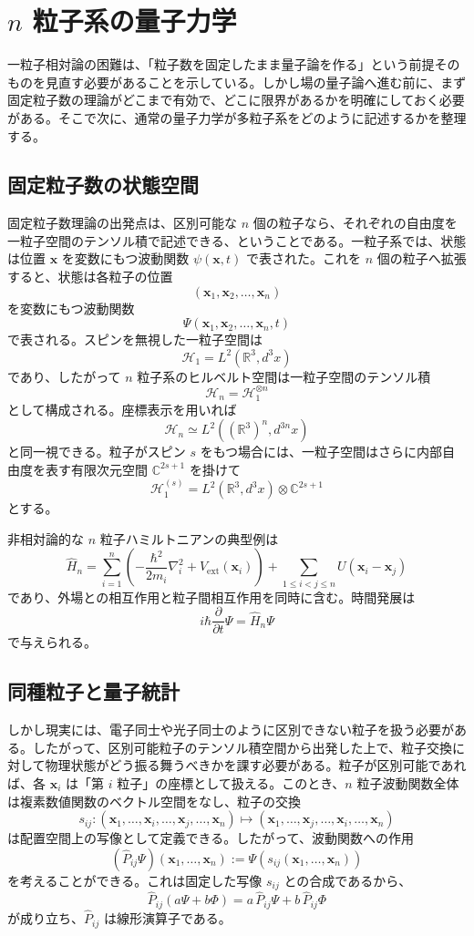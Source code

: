 \section{$n$ 粒子系の量子力学}

一粒子相対論の困難は、「粒子数を固定したまま量子論を作る」という前提そのものを見直す必要があることを示している。しかし場の量子論へ進む前に、まず固定粒子数の理論がどこまで有効で、どこに限界があるかを明確にしておく必要がある。そこで次に、通常の量子力学が多粒子系をどのように記述するかを整理する。

\subsection{固定粒子数の状態空間}
固定粒子数理論の出発点は、区別可能な $n$ 個の粒子なら、それぞれの自由度を一粒子空間のテンソル積で記述できる、ということである。一粒子系では、状態は位置 $\mathbf{x}$ を変数にもつ波動関数 $\psi(\mathbf{x},t)$ で表された。これを $n$ 個の粒子へ拡張すると、状態は各粒子の位置
\[
(\mathbf{x}_1,\mathbf{x}_2,\dots,\mathbf{x}_n)
\]
を変数にもつ波動関数
\[
\Psi(\mathbf{x}_1,\mathbf{x}_2,\dots,\mathbf{x}_n,t)
\]
で表される。スピンを無視した一粒子空間は
\[
\mathcal{H}_1 = L^2(\mathbb{R}^3,d^3x)
\]
であり、したがって $n$ 粒子系のヒルベルト空間は一粒子空間のテンソル積
\[
\mathcal{H}_n = \mathcal{H}_1^{\otimes n}
\]
として構成される。座標表示を用いれば
\[
\mathcal{H}_n \simeq L^2((\mathbb{R}^3)^n,d^{3n}x)
\]
と同一視できる。粒子がスピン $s$ をもつ場合には、一粒子空間はさらに内部自由度を表す有限次元空間 $\mathbb{C}^{2s+1}$ を掛けて
\[
\mathcal{H}_1^{(s)}
=
L^2(\mathbb{R}^3,d^3x)\otimes \mathbb{C}^{2s+1}
\]
とする。

非相対論的な $n$ 粒子ハミルトニアンの典型例は
\[
\hat{H}_n
= \sum_{i=1}^n \left( -\frac{\hbar^2}{2m_i}\nabla_i^2 + V_{\mathrm{ext}}(\mathbf{x}_i) \right)
+ \sum_{1\le i<j\le n} U(\mathbf{x}_i-\mathbf{x}_j)
\]
であり、外場との相互作用と粒子間相互作用を同時に含む。時間発展は
\[
i\hbar \frac{\partial}{\partial t}\Psi = \hat{H}_n \Psi
\]
で与えられる。

\subsection{同種粒子と量子統計}
しかし現実には、電子同士や光子同士のように区別できない粒子を扱う必要がある。したがって、区別可能粒子のテンソル積空間から出発した上で、粒子交換に対して物理状態がどう振る舞うべきかを課す必要がある。粒子が区別可能であれば、各 $\mathbf{x}_i$ は「第 $i$ 粒子」の座標として扱える。このとき、$n$ 粒子波動関数全体は複素数値関数のベクトル空間をなし、粒子の交換
\[
s_{ij} : (\mathbf{x}_1,\dots,\mathbf{x}_i,\dots,\mathbf{x}_j,\dots,\mathbf{x}_n)
\mapsto
(\mathbf{x}_1,\dots,\mathbf{x}_j,\dots,\mathbf{x}_i,\dots,\mathbf{x}_n)
\]
は配置空間上の写像として定義できる。したがって、波動関数への作用
\[
(\hat{P}_{ij}\Psi)(\mathbf{x}_1,\dots,\mathbf{x}_n)
:=
\Psi(s_{ij}(\mathbf{x}_1,\dots,\mathbf{x}_n))
\]
を考えることができる。これは固定した写像 $s_{ij}$ との合成であるから、
\[
\hat{P}_{ij}(a\Psi+b\Phi)
=
a\,\hat{P}_{ij}\Psi+b\,\hat{P}_{ij}\Phi
\]
が成り立ち、$\hat{P}_{ij}$ は線形演算子である。

